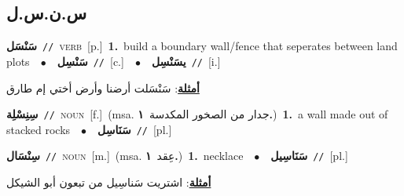 \documentclass[10pt,a4paper,twoside]{article} %
\begin{document}
\begin{multicols}{2}
\vspace{-3mm}
\subsection*{\color{blue}\foreignlanguage{arabic}{س.ن.س.ل}\color{blue}{}} 

{\setlength\topsep{0pt}\textbf{\foreignlanguage{arabic}{سَنْسَل}}\ {\color{gray}\texttt{//}\color{black}}\ \textsc{verb}\ [p.]\ \textbf{1.}~build a boundary wall/fence that seperates between land plots\ \ $\bullet$\ \ \setlength\topsep{0pt}\textbf{\foreignlanguage{arabic}{سَنْسِل}}\ {\color{gray}\texttt{//}\color{black}}\ [c.]\ \ $\bullet$\ \ \setlength\topsep{0pt}\textbf{\foreignlanguage{arabic}{يسَنْسِل}}\ {\color{gray}\texttt{//}\color{black}}\ [i.]\  \begin{flushright}\color{gray}\foreignlanguage{arabic}{\textbf{\underline{\foreignlanguage{arabic}{أمثلة}}}: سَنْسَلت أرضنا وأرض أختي إم طارق}\end{flushright}\color{black}} \vspace{2mm}

{\setlength\topsep{0pt}\textbf{\foreignlanguage{arabic}{سِنِسْلِة}}\ {\color{gray}\texttt{//}\color{black}}\ \textsc{noun}\ [f.]\ \color{gray}(msa. \foreignlanguage{arabic}{جدار من الصخور المكدسة}~\foreignlanguage{arabic}{\textbf{١.}})\color{black}\ \textbf{1.}~a wall made out of stacked rocks\ \ $\bullet$\ \ \setlength\topsep{0pt}\textbf{\foreignlanguage{arabic}{سَنَاسِل}}\ {\color{gray}\texttt{//}\color{black}}\ [pl.]\ } \vspace{2mm}

{\setlength\topsep{0pt}\textbf{\foreignlanguage{arabic}{سِنْسَال}}\ {\color{gray}\texttt{//}\color{black}}\ \textsc{noun}\ [m.]\ \color{gray}(msa. \foreignlanguage{arabic}{عِقد}~\foreignlanguage{arabic}{\textbf{١.}})\color{black}\ \textbf{1.}~necklace\ \ $\bullet$\ \ \setlength\topsep{0pt}\textbf{\foreignlanguage{arabic}{سَنَاسِيل}}\ {\color{gray}\texttt{//}\color{black}}\ [pl.]\  \begin{flushright}\color{gray}\foreignlanguage{arabic}{\textbf{\underline{\foreignlanguage{arabic}{أمثلة}}}: اشتريت سَناسِيل من تبعون أبو الشيكل}\end{flushright}\color{black}} \vspace{2mm}


\end{multicols}
\end{document}
